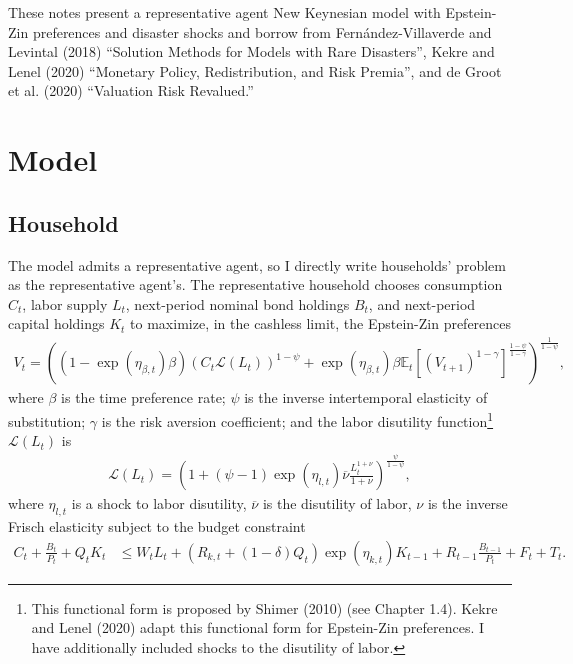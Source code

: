 \documentclass[12 pt, oneside]{article}
\theoremstyle{definition}
\theoremstyle{definition}
\theoremstyle{definition}
\newcommand{\E}{\mathbb{E}}
\newcommand{\calL}{\mathcal{L}}
\begin{document}
These notes present a representative agent New Keynesian model with Epstein-Zin preferences and disaster shocks and borrow from Fern{\'a}ndez-Villaverde and Levintal (2018) ``Solution Methods for Models with Rare Disasters'', Kekre and Lenel (2020) ``Monetary Policy, Redistribution, and Risk Premia'', and de Groot et al. (2020) ``Valuation Risk Revalued.''

\section{Model}\label{sec:model}

\subsection{Household}

The model admits a representative agent, so I directly write households' problem as the representative agent's. The representative household chooses consumption $C_t$, labor supply $L_t$, next-period nominal  bond holdings $B_t$, and next-period capital holdings $K_t$ to maximize, in the cashless limit, the Epstein-Zin preferences
\begin{align}\label{eq:hh objective}
  V_t = \left((1 - \exp(\eta_{\beta, t})\beta)\left(C_t \calL(L_t)\right)^{1 - \psi} + \exp(\eta_{\beta, t})\beta \E_t\left[\left(V_{t + 1}\right)^{1 - \gamma}\right]^{\frac{1 - \psi}{1 - \gamma}}\right)^{\frac{1}{1 - \psi}},
\end{align}
where $\beta$ is the time preference rate; $\psi$ is the inverse intertemporal elasticity of substitution; $\gamma$ is the risk aversion coefficient; and
the labor disutility function\footnote{This functional form is proposed by Shimer (2010) (see Chapter 1.4). Kekre and Lenel (2020) adapt this functional form for Epstein-Zin preferences. I have additionally included shocks to the disutility of labor.} $\calL(L_t)$ is
\begin{align}
  \calL(L_t) = \left(1 + (\psi - 1)\exp(\eta_{l, t})\overline{\nu}\frac{L_t^{1  + \nu}}{1 + \nu}\right)^{\frac{\psi}{1 - \psi}},
\end{align}
where $\eta_{l, t}$ is a shock to labor disutility, $\overline{\nu}$ is the disutility of labor, $\nu$ is the inverse Frisch elasticity
subject to the budget constraint
\begin{align}\label{eq:hh budget constraint}
  C_t + \frac{B_t}{P_t} + Q_tK_t & \leq W_t L_t + (R_{k, t} + (1 - \delta)Q_t)\exp(\eta_{k, t}) K_{t - 1} + R_{t - 1} \frac{B_{t - 1}}{P_t} + F_t + T_t.
\end{align}
\end{document}
